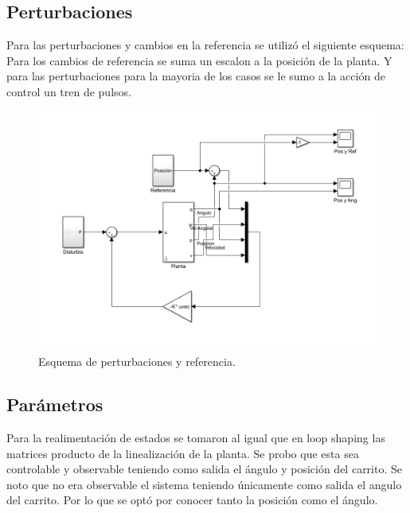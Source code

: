 \subsection{Perturbaciones}
Para las perturbaciones y cambios en la referencia se utiliz\'o el siguiente esquema:
Para los cambios de referencia se suma un escalon a la posici\'on de la planta. Y para las perturbaciones para la mayoria de los casos se le sumo a la acci\'on de control un tren de pulsos.
\begin{figure}[H]
	\centering
	\includegraphics[width=1\linewidth]{Imagenes/Esquema_general.png}
	\caption{Esquema de perturbaciones y referencia.}
	\label{esq}
\end{figure}

\subsection{Par\'ametros}
 Para la realimentación de estados se tomaron al igual que en loop shaping las matrices producto de la linealizaci\'on de la planta.
 Se probo que esta sea controlable y observable teniendo como salida el \'angulo y posici\'on del carrito.
 Se noto que no era observable el sistema teniendo únicamente como salida el angulo del carrito. Por lo que se opt\'o por conocer tanto la posici\'on como el \'angulo.
 
